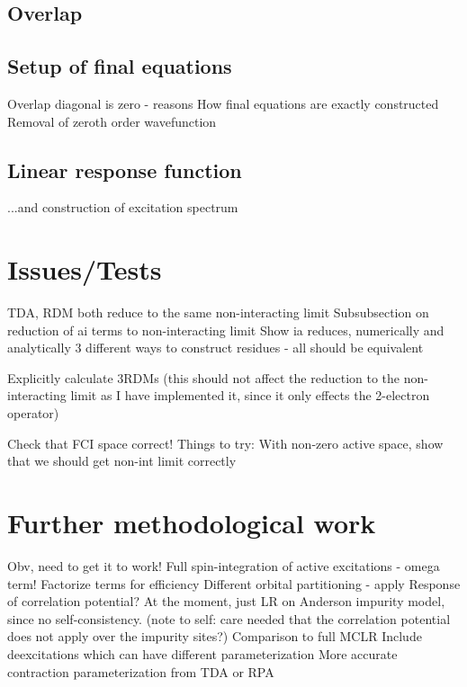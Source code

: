 \documentclass[a4paper,oneside,11pt]{article}
\numberwithin{equation}{section}
\begin{document}
\subsection{Overlap}
\subsection{Setup of final equations}
Overlap diagonal is zero - reasons
How final equations are exactly constructed
Removal of zeroth order wavefunction
\subsection{Linear response function}
...and construction of excitation spectrum
\section{Issues/Tests}
TDA, RDM both reduce to the same non-interacting limit
Subsubsection on reduction of ai terms to non-interacting limit
Show ia reduces, numerically and analytically
3 different ways to construct residues - all should be equivalent

Explicitly calculate 3RDMs (this should not affect the reduction to the non-interacting limit as I have implemented it, since it only effects the 2-electron operator)

Check that FCI space correct!
Things to try: With non-zero active space, show that we should get non-int limit correctly
\section{Further methodological work}
Obv, need to get it to work!
Full spin-integration of active excitations
- omega term!
Factorize terms for efficiency
Different orbital partitioning - apply
Response of correlation potential? At the moment, just LR on Anderson impurity model, since no self-consistency. (note to self: care needed that the correlation potential does not apply over the impurity sites?)
Comparison to full MCLR
Include deexcitations which can have different parameterization
More accurate contraction parameterization from TDA or RPA
\end{document}
